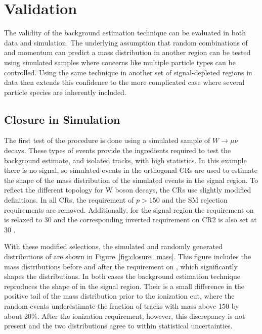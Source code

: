 
\section{Validation}

The validity of the background estimation technique can be evaluated in both data and simulation.
The underlying assumption that random combinations of \dedx and momentum can predict a mass distribution in another region can be tested using simulated samples where concerns like multiple particle types can be controlled.
Using the same technique in another set of signal-depleted regions in data then extends this confidence to the more complicated case where several particle species are inherently included.

\subsection{Closure in Simulation}
The first test of the procedure is done using a simulated sample of $W\rightarrow\mu\nu$ decays.
These types of events provide the ingredients required to test the background estimate, \met and isolated tracks, with high statistics.
In this example there is no signal, so simulated events in the orthogonal \acp{CR} are used to estimate the shape of the mass distribution of the simulated events in the signal region.
To reflect the different topology for W boson decays, the \acp{CR} use slightly modified definitions.
In all \acp{CR}, the requirement of $p > 150$ \GeV and the \ac{SM} rejection requirements are removed.
Additionally, for the signal region the requirement on \met is relaxed to 30 \GeV and the corresponding inverted requirement on CR2 is also set at 30 \GeV.

With these modified selections, the simulated and randomly generated distributions of \mdedx are shown in Figure~\ref{fig:closure_mass}. 
This figure includes the mass distributions before and after the requirement on \dedx, which significantly shapes the distributions.
In both cases the background estimation technique reproduces the shape of \mdedx in the signal region.
Their is a small difference in the positive tail of the mass distribution prior to the ionization cut, where the random events underestimate the fraction of tracks with mass above 150 \GeV by about 20\%.
After the ionization requirement, however, this discrepancy is not present and the two distributions agree to within statistical uncertainties.

